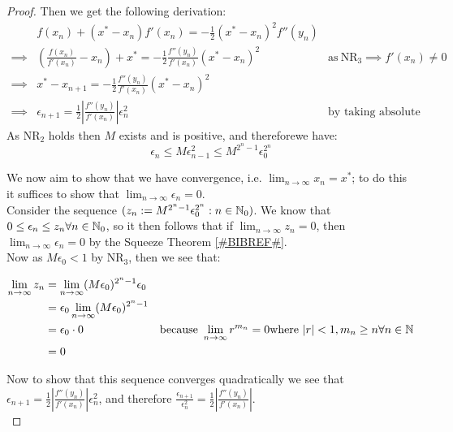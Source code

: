 \begin{Uniform Convergence Thm}
\begin{proof}
Then we get the following derivation:
\begin{displaymath}
\begin{align*}
	&f(x_n) + (x^\ast - x_n)f'(x_n) = 
		-\frac{1}{2}(x^\ast - x_n)^2f''(y_n)\\
	\implies &(\frac{f(x_n)}{f'(x_n)} - x_n) + x^\ast =
		-\frac{1}{2}\frac{f''(y_n)}{f'(x_n)}(x^\ast - x_n)^2
		&\textrm{as} \ \textrm{NR}_3 \implies f'(x_n) \neq 0\\
	\implies &x^\ast - x_{n+1} = 
		-\frac{1}{2}\frac{f''(y_n)}{f'(x_n)}(x^\ast - x_n)^2\\
	\implies &\epsilon_{n+1} =
		\frac{1}{2}\left|\frac{f''(y_n)}{f'(x_n)}\right|\epsilon_n^2
		&\textrm{by taking absolute values}
\end{align*}
\end{displaymath}
As \(\textrm{NR}_2\) holds then \(M\) exists and is positive, and thereforewe have:
\[\epsilon_n \le M\epsilon_{n-1}^2 \le M^{2^n - 1}\epsilon_0^{2^n}\]

We now aim to show that we have convergence, i.e. \(\lim_{n \to \infty} x_n = x^\ast\); to do this it suffices to show that \(\lim_{n\to\infty}\epsilon_n = 0\).\\

Consider the sequence \((z_n := M^{2^n - 1}\epsilon_0^{2^n} : n \in \mathbb{N}_0)\). We know that \(0 \le \epsilon_n \le z_n \forall n \in \mathbb{N}_0\), so it then follows that if \(\lim_{n \to \infty}z_n = 0\), then \(\lim_{n \to \infty}\epsilon_n = 0\) by the Squeeze Theorem \ref{#BIBREF#}.\\

Now as \(M\epsilon_0 < 1\) by \(\textrm{NR}_3\), then we see that:

\begin{displaymath}
\begin{align*}
\lim_{n\to\infty}z_n 
	&= \lim_{n\to\infty}(M\epsilon_0)^{2^n - 1}\epsilon_0\\ 
	&= \epsilon_0\lim_{n\to\infty}(M\epsilon_0)^{2^n - 1}\\
	&= \epsilon_0\cdot0
		&\textrm{because } \lim_{n\to\infty}r^{m_n} = 0 \textrm{where }
			|r| < 1, m_n \ge n \forall n \in \mathbb{N}\\
	&= 0
\end{align*}
\end{displaymath}

Now to show that this sequence converges quadratically we see that \(\epsilon_{n+1} = \frac{1}{2}\left|\frac{f''(y_n)}{f'(x_n)}\right|\epsilon_n^2\), and therefore \(\frac{\epsilon_{n+1}}{\epsilon_n^2} = \frac{1}{2}\left|\frac{f''(y_n)}{f'(x_n)}\right|\).\\


\end{proof}
\end{Uniform Convergence Thm}
